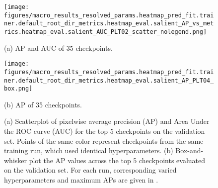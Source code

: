 \begin{figure}[ht]
\centering

\texttt{[image: figures/macro\_results\_resolved\_params.heatmap\_pred\_fit.trainer.default\_root\_dir\_metrics.heatmap\_eval.salient\_AP\_vs\_metrics.heatmap\_eval.salient\_AUC\_PLT02\_scatter\_nolegend.png]}

(a) AP and AUC of 35 checkpoints.

\texttt{[image: figures/macro\_results\_resolved\_params.heatmap\_pred\_fit.trainer.default\_root\_dir\_metrics.heatmap\_eval.salient\_AP\_PLT04\_box.png]}

(b) AP of 35 checkpoints.

\caption[]{
    (a) Scatterplot of pixelwise average precision (AP) and Area Under the ROC curve (AUC) for the top
      5 checkpoints on the validation set.
    Points of the same color represent checkpoints from the same training run, which used identical
      hyperparameters.
    (b) Box-and-whisker plot the AP values across the top 5 checkpoints evaluated on
      the validation set.
    For each run, corresponding varied hyperparameters and maximum APs are given in
      .
}
\label{fig:apauc_scatter}
\end{figure}



